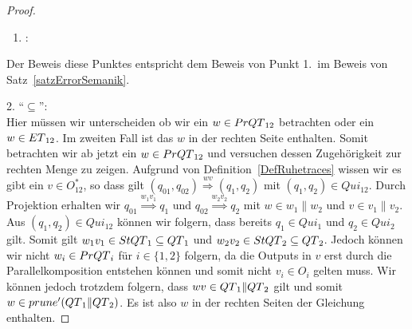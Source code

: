 \begin{proof}
  ~
  \begin{enumerate}
    \item \hspace{-0.2cm}:
  \end{enumerate}
  \vspace{-0.3cm}
  Der Beweis diese Punktes entspricht dem Beweis von Punkt 1.\ im Beweis von
  Satz~\ref{satzErrorSemanik}.

  2. ``$\subseteq$'':\\
  Hier müssen wir unterscheiden ob wir ein $w\in PrQT{}_{12}$ betrachten oder
  ein $w\in ET{}_{12}$. Im zweiten Fall ist das $w$ in der rechten Seite
  enthalten. Somit betrachten wir ab jetzt ein
  $w\in PrQT{}_{12}$ und versuchen dessen Zugehörigkeit zur rechten Menge zu
  zeigen. Aufgrund von Definition~\ref{DefRuhetraces} wissen wir es gibt ein
  $v\in O_{12}^*$, so dass gilt
  $(q_{01},q_{02}) \overset{wv}{\Rightarrow} (q_1,q_2)$ mit $(q_1,q_2)\in
  Qui_{12}$. Durch Projektion erhalten wir $q_{01} \overset{w_1v_1}{\Rightarrow}
  q_1$ und $q_{02} \overset{w_2v_2}{\Rightarrow} q_2$ mit $w\in w_1\|w_2$ und
  $v\in v_1\|v_2$. Aus
  $(q_1,q_2)\in Qui_{12}$ können wir folgern, dass bereits $q_1\in Qui_1$ und
  $q_2\in Qui_2$ gilt. Somit gilt $w_1v_1\in StQT{}_1\subseteq QT{}_1$ und
  $w_2v_2\in StQT{}_2\subseteq QT{}_2$. Jedoch können wir nicht $w_i\in
  PrQT{}_i$ für $i\in\{1,2\}$ folgern, da die Outputs in $v$ erst durch die
  Parallelkomposition entstehen können und somit nicht $v_i\in O_i$ gelten
  muss. Wir können jedoch trotzdem folgern, dass $wv\in QT{}_1\|QT{}_2$ gilt
  und somit $w\in prune' (QT{}_1\|QT{}_2)$. Es ist also $w$ in der rechten
  Seiten der Gleichung enthalten.


\end{proof}
